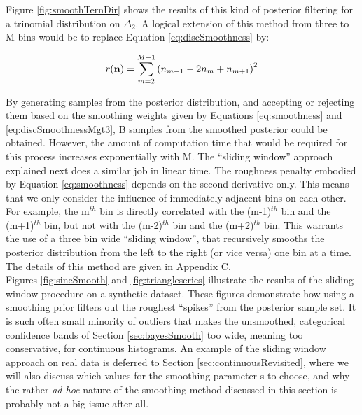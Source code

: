 \documentclass{article}
\begin{document}
Figure  \ref{fig:smoothTernDir}  shows the  results  of  this kind  of
posterior  filtering for  a trinomial  distribution on  $\Delta_2$.  A
logical extension  of this  method from  three to M  bins would  be to
replace Equation \ref{eq:discSmoothness} by:

\begin{equation}
r({\bf n}) = \sum_{m=2}^{M-1}\left(n_{m-1} - 2n_m + n_{m+1}\right)^2
\label{eq:discSmoothnessMgt3}
\end{equation}

By generating  samples from the posterior  distribution, and accepting
or rejecting  them based on  the smoothing weights given  by Equations
\ref{eq:smoothness}  and \ref{eq:discSmoothnessMgt3},  B  samples from
the  smoothed posterior  could be  obtained.  However,  the  amount of
computation  time that would  be required  for this  process increases
exponentially with M.  The  ``sliding window'' approach explained next
does a similar job in  linear time.  The roughness penalty embodied by
Equation  \ref{eq:smoothness} depends on  the second  derivative only.
This means that we only consider the influence of immediately adjacent
bins  on  each other.   For  example,  the  m$^{th}$ bin  is  directly
correlated with the (m-1)$^{th}$ bin and the (m+1)$^{th}$ bin, but not
with the (m-2)$^{th}$ bin and the (m+2)$^{th}$ bin.  This warrants the
use of a  three bin wide ``sliding window'',  that recursively smooths
the posterior distribution from the  left to the right (or vice versa)
one bin  at a time. The details  of this method are  given in Appendix
C.\\

Figures  \ref{fig:sineSmooth} and  \ref{fig:triangleseries} illustrate
the results  of the sliding  window procedure on a  synthetic dataset.
These figures demonstrate how using  a smoothing prior filters out the
roughest ``spikes''  from the posterior  sample set. It is  such often
small  minority of  outliers  that makes  the unsmoothed,  categorical
confidence  bands of Section  \ref{sec:bayesSmooth} too  wide, meaning
too conservative, for continuous histograms. An example of the sliding
window   approach    on   real    data   is   deferred    to   Section
\ref{sec:continuousRevisited}, where we will also discuss which values
for the  smoothing parameter s to  choose, and why the  rather {\it ad
hoc}  nature of  the smoothing  method  discussed in  this section  is
probably not a big issue after all.
\end{document}
